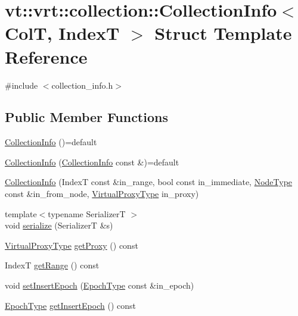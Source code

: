 \hypertarget{structvt_1_1vrt_1_1collection_1_1_collection_info}{}\section{vt\+:\+:vrt\+:\+:collection\+:\+:Collection\+Info$<$ ColT, IndexT $>$ Struct Template Reference}
\label{structvt_1_1vrt_1_1collection_1_1_collection_info}


{\ttfamily \#include $<$collection\+\_\+info.\+h$>$}

\subsection*{Public Member Functions}
\begin{DoxyCompactItemize}
\item 
\hyperlink{structvt_1_1vrt_1_1collection_1_1_collection_info_a92a25c0c5f12cc3e97b60ef8d011a348}{Collection\+Info} ()=default
\item 
\hyperlink{structvt_1_1vrt_1_1collection_1_1_collection_info_a8b280b46f8afe9a170d718c08d8d5a54}{Collection\+Info} (\hyperlink{structvt_1_1vrt_1_1collection_1_1_collection_info}{Collection\+Info} const \&)=default
\item 
\hyperlink{structvt_1_1vrt_1_1collection_1_1_collection_info_a8f1f1ea8fffa846772e35288afad5767}{Collection\+Info} (IndexT const \&in\+\_\+range, bool const in\+\_\+immediate, \hyperlink{namespacevt_a866da9d0efc19c0a1ce79e9e492f47e2}{Node\+Type} const \&in\+\_\+from\+\_\+node, \hyperlink{namespacevt_a1b417dd5d684f045bb58a0ede70045ac}{Virtual\+Proxy\+Type} in\+\_\+proxy)
\item 
{\footnotesize template$<$typename SerializerT $>$ }\\void \hyperlink{structvt_1_1vrt_1_1collection_1_1_collection_info_aca2483c9363bcdea2c50641eba714a27}{serialize} (SerializerT \&s)
\item 
\hyperlink{namespacevt_a1b417dd5d684f045bb58a0ede70045ac}{Virtual\+Proxy\+Type} \hyperlink{structvt_1_1vrt_1_1collection_1_1_collection_info_ab8b416dfab5de9f872c7588bd567cd3c}{get\+Proxy} () const
\item 
IndexT \hyperlink{structvt_1_1vrt_1_1collection_1_1_collection_info_a5f3641f40cadee9d13ca924adbd42071}{get\+Range} () const
\item 
void \hyperlink{structvt_1_1vrt_1_1collection_1_1_collection_info_a277ee82791f09d03c84bb6dd81051fca}{set\+Insert\+Epoch} (\hyperlink{namespacevt_a81d11b28122d43bf9834577e4a06440f}{Epoch\+Type} const \&in\+\_\+epoch)
\item 
\hyperlink{namespacevt_a81d11b28122d43bf9834577e4a06440f}{Epoch\+Type} \hyperlink{structvt_1_1vrt_1_1collection_1_1_collection_info_a9c81de9eeddd203f92d76d80b2e09e3c}{get\+Insert\+Epoch} () const
\end{DoxyCompactItemize}
